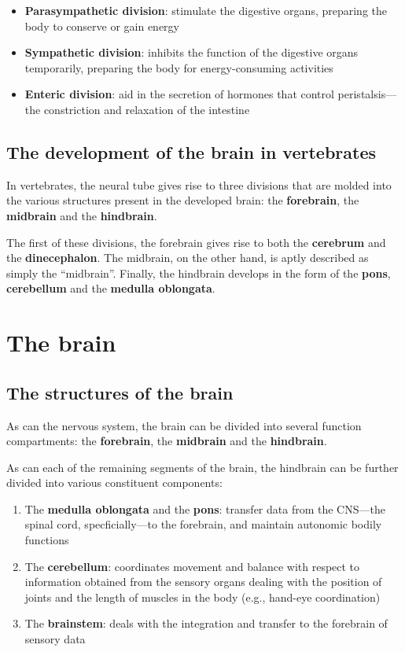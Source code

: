 \documentclass{article}
\begin{document}
\begin{itemize}
	\item \textbf{Parasympathetic division}: stimulate the digestive organs,
		preparing the body to conserve or gain energy
	\item \textbf{Sympathetic division}: inhibits the function of the digestive
		organs temporarily, preparing the body for energy-consuming activities
	\item \textbf{Enteric division}: aid in the secretion of hormones that
		control peristalsis---the constriction and relaxation of the intestine
\end{itemize}

\subsection{The development of the brain in vertebrates}

In vertebrates, the neural tube gives rise to three divisions that are molded
into the various structures present in the developed brain: the 
\textbf{forebrain}, the \textbf{midbrain} and the \textbf{hindbrain}.

The first of these divisions, the forebrain gives rise to both the
\textbf{cerebrum} and the \textbf{dinecephalon}. The midbrain, on the other
hand, is aptly described as simply the ``midbrain''. Finally, the hindbrain
develops in the form of the \textbf{pons}, \textbf{cerebellum} and the
\textbf{medulla oblongata}.

\section{The brain}

\subsection{The structures of the brain}

As can the nervous system, the brain can be divided into several function
compartments: the \textbf{forebrain}, the \textbf{midbrain} and the
\textbf{hindbrain}.

As can each of the remaining segments of the brain, the hindbrain can be
further divided into various constituent components:

\begin{enumerate}
	\item The \textbf{medulla oblongata} and the \textbf{pons}: transfer data
		from the CNS---the spinal cord, specficially---to the forebrain, and
		maintain autonomic bodily functions
	\item The \textbf{cerebellum}: coordinates movement and balance with
		respect to information obtained from the sensory organs dealing with
		the position of joints and the length of muscles in the body (e.g.,
		hand-eye coordination)
	\item The \textbf{brainstem}: deals with the integration and transfer to the
		forebrain of sensory data
\end{enumerate}
\end{document}
